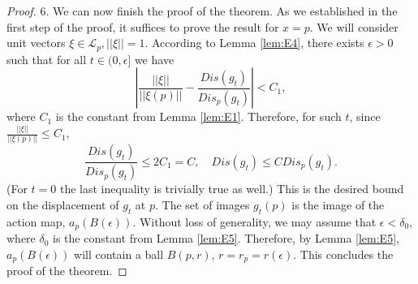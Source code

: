 \documentclass[12pt]{amsbook}%
\theoremstyle{definition}
\theoremstyle{remark}
\numberwithin{section}{chapter}
\numberwithin{subsection}{section}
\numberwithin{figure}{chapter}
\def\eps{\epsilon}
\def\cL{{\mathscr{L}}}
\def\mini{\scriptsize}
\begin{document}
{{\begin{proof}
6. We can now finish the proof of the theorem. As we established in the first step of the proof, it suffices to prove the result for $x=p$. We will consider unit vectors 
$\xi\in \cL_p, ||\xi||=1$. According to Lemma \ref{lem:E4}, there exists $\eps>0$ such that for all $t\in (0,\eps]$ we have 
$$
\left| \frac{||\xi||}{||\xi(p)||} - \frac{Dis(g_t)}{Dis_p(g_t)}\right|< C_1, 
$$
where $C_1$ is the constant from Lemma \ref{lem:E1}. Therefore, for such $t$, since $\frac{||\xi||}{||\xi(p)||} \leqslant C_1$, 
$$
\frac{Dis(g_t)}{Dis_p(g_t)} \leqslant 2C_1=C, \quad Dis(g_t) \leqslant C Dis_p(g_t). 
$$
(For $t=0$ the last inequality is trivially true as well.) This is the desired bound on the displacement of $g_t$ at $p$. The set of images $g_t(p)$ is the image of the 
action map, $a_p(B(\eps))$. Without loss of generality, we may assume that $\eps<\delta_0$, where $\delta_0$ is the constant from Lemma \ref{lem:E5}. Therefore, 
by Lemma \ref{lem:E5}, $a_p(B(\eps))$ will contain a ball $B(p,r)$, $r=r_p=r(\eps)$. This concludes the proof of the theorem. 
\end{proof}





}}
\end{document}
